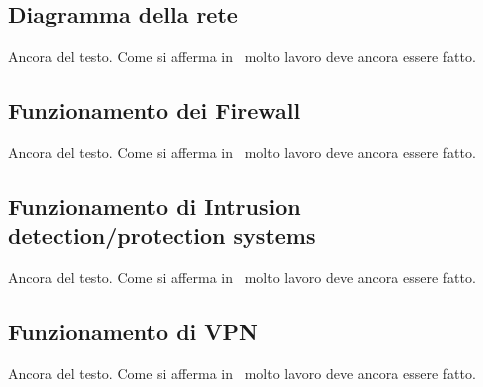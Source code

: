 \subsection{Diagramma della rete}

Ancora del testo. Come si afferma in~\cite{jones96analysis} molto lavoro deve ancora essere fatto.

\subsection{Funzionamento dei Firewall}

Ancora del testo. Come si afferma in~\cite{jones96analysis} molto lavoro deve ancora essere fatto.

\subsection{Funzionamento di Intrusion detection/protection systems}

Ancora del testo. Come si afferma in~\cite{jones96analysis} molto lavoro deve ancora essere fatto.

\subsection{Funzionamento di VPN}

Ancora del testo. Come si afferma in~\cite{jones96analysis} molto lavoro deve ancora essere fatto.
